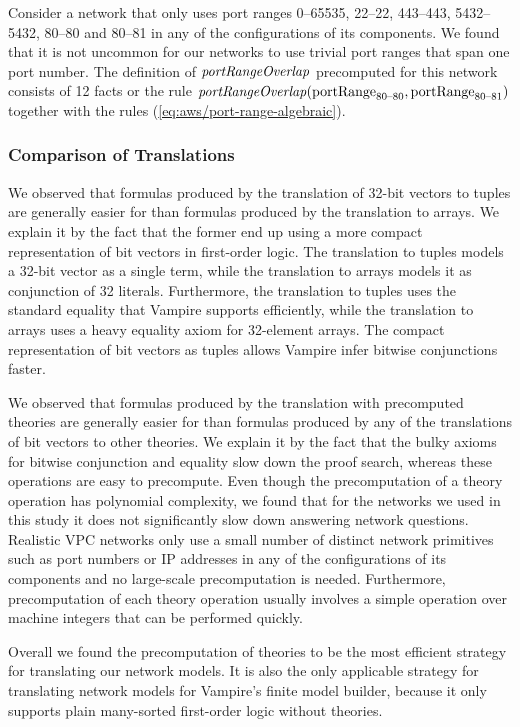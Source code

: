 Consider a network that only uses port ranges 0--65535, 22--22, 443--443, 5432--5432, 80--80 and 80--81 in any of the configurations of its components. We found that it is not uncommon for our networks to use trivial port ranges that span one port number. The definition of $\mathit{portRangeOverlap}$ precomputed for this network consists of 12 facts or the rule $\mathit{portRangeOverlap}(\mathrm{portRange}_\text{80--80},\mathrm{portRange}_\text{80--81})$ together with the rules (\ref{eq:aws/port-range-algebraic}).

\subsubsection*{Comparison of Translations}
We observed that formulas produced by the translation of 32-bit vectors to tuples are generally easier for \vampire than formulas produced by the translation to arrays. We explain it by the fact that the former end up using a more compact representation of bit vectors in first-order logic. The translation to tuples models a 32-bit vector as a single term, while the translation to arrays models it as conjunction of 32 literals. Furthermore, the translation to tuples uses the standard equality that Vampire supports efficiently, while the translation to arrays uses a heavy equality axiom for 32-element arrays. The compact representation of bit vectors as tuples allows Vampire infer bitwise conjunctions faster.

We observed that formulas produced by the translation with precomputed theories are generally easier for \vampire than formulas produced by any of the translations of bit vectors to other theories. We explain it by the fact that the bulky axioms for bitwise conjunction and equality slow down the proof search, whereas these operations are easy to precompute. Even though the precomputation of a theory operation has polynomial complexity, we found that for the networks we used in this study it does not significantly slow down answering network questions. Realistic VPC networks only use a small number of distinct network primitives such as port numbers or IP addresses in any of the configurations of its components and no large-scale precomputation is needed. Furthermore, precomputation of each theory operation usually involves a simple operation over machine integers that can be performed quickly.

Overall we found the precomputation of theories to be the most efficient strategy for translating our network models. It is also the only applicable strategy for translating network models for Vampire's finite model builder, because it only supports plain many-sorted first-order logic without theories.

